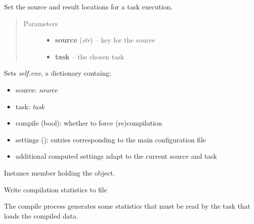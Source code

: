 \documentclass[letterpaper,10pt,english]{sphinxmanual}
\begin{document}
\begin{fulllineitems}

\begin{fulllineitems}
\label{graf/graf:graf.graf.Graf.set_environment}
Set the source and result locations for a task execution.
\begin{quote}\begin{description}
\item[{Parameters}] \leavevmode\begin{itemize}
\item {} 
\textbf{source} (\emph{str}) --
key for the source

\item {} 
\textbf{task} --
the chosen task

\end{itemize}

\end{description}\end{quote}

Sets \emph{self.env}, a dictionary containg:
\begin{itemize}
\item {} 
source: \emph{source}

\item {} 
task: \emph{task}

\item {} 
compile (bool): whether to force (re)compilation

\item {} 
settings (\href{http://docs.python.org/library/configparser.html\#ConfigParser.ConfigParser}{}): entries corresponding to the main configuration file

\item {} 
additional computed settings adapt to the current source and task

\end{itemize}

\end{fulllineitems}


\begin{fulllineitems}
\label{graf/graf:graf.graf.Graf.stamp}
Instance member holding the {\hyperref[graf/graf:graf.timestamp.Timestamp]{}} object.

\end{fulllineitems}


\begin{fulllineitems}
\label{graf/graf:graf.graf.Graf.write_stats}
Write compilation statistics to file

The compile process generates some statistics that must be read by the task that loads the compiled data.

\end{fulllineitems}


\end{fulllineitems}
\end{document}
